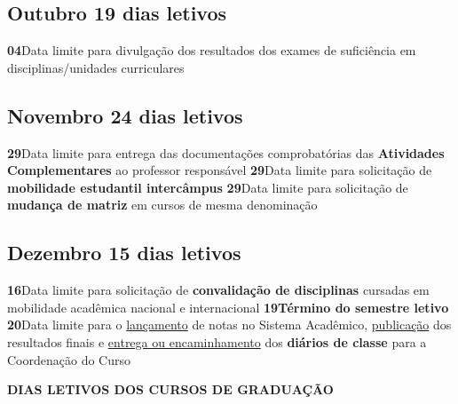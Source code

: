 \documentclass[thesis]{hmcposter}
\begin{document}
\begin{poster}
\subsection{Outubro \hfill 19 dias letivos}\textbf{04}\qquad Data limite para divulgação dos resultados dos exames de suficiência em disciplinas/unidades curriculares \newline \null\subsection{Novembro \hfill 24 dias letivos}\textbf{29}\qquad Data limite para entrega das documentações comprobatórias das \textbf{Atividades Complementares} ao professor responsável \newline \null\textbf{29}\qquad Data limite para solicitação de \textbf{mobilidade estudantil intercâmpus} \newline \null\textbf{29}\qquad Data limite para solicitação de \textbf{mudança de matriz} em cursos de mesma denominação \newline \null\subsection{Dezembro \hfill 15 dias letivos}\textbf{16}\qquad Data limite para solicitação de \textbf{convalidação de disciplinas} cursadas em mobilidade acadêmica nacional e internacional \newline \null\textbf{19}\qquad \textbf{Término do semestre letivo} \newline \null\textbf{20}\qquad Data limite para o \underline{lançamento} de notas no Sistema Acadêmico, \underline{publicação} dos resultados finais e \underline{entrega ou encaminhamento} dos \textbf{diários de classe} para a Coordenação do Curso \newline \null\newpage
~
\vfill
\begin{center}
\large \textbf{DIAS LETIVOS DOS CURSOS DE GRADUAÇÃO}
\newline
\null
\newline
\begin{table}
\centering
{}
\end{table}
\end{center}
\end{poster}
\end{document}
